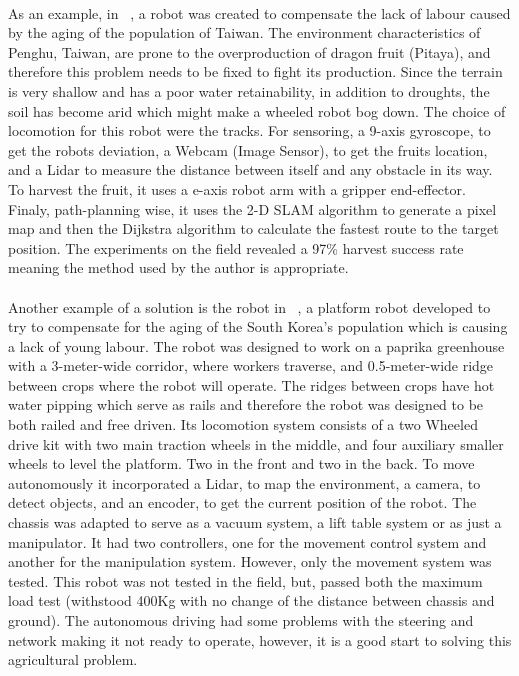 \paragraph{}As an example, in ~\cite{10113871}, a robot was created to compensate the lack of labour caused by the aging of the population of Taiwan. 
The environment characteristics of Penghu, Taiwan, are prone to the overproduction of dragon fruit (Pitaya), and therefore this problem needs 
to be fixed to fight its production. Since the terrain is very shallow and has a poor water retainability, in addition to droughts, the soil 
has become arid which might make a wheeled robot bog down. The choice of locomotion for this robot were the tracks. For sensoring, a 9-axis 
gyroscope, to get the robots deviation, a Webcam (Image Sensor), to get the fruits location, and a Lidar to measure the distance between itself 
and any obstacle in its way. To harvest the fruit, it uses a e-axis robot arm with a gripper end-effector. Finaly, path-planning wise, it uses 
the 2-D SLAM algorithm to generate a pixel map and then the Dijkstra algorithm to calculate the fastest route to the target position. 
The experiments on the field revealed a 97\% harvest success rate meaning the method used by the author is appropriate.

\paragraph{}Another example of a solution is the robot in ~\cite{app12094335}, a platform robot developed to try to compensate for the aging of the South Korea’s 
population which is causing a lack of young labour. The robot was designed to work on a paprika greenhouse with a 3-meter-wide corridor, 
where workers traverse, and 0.5-meter-wide ridge between crops where the robot will operate. The ridges between crops have 
hot water pipping which serve as rails and therefore the robot was designed to be both railed and free driven. Its locomotion system consists 
of a two Wheeled drive kit with two main traction wheels in the middle, and four auxiliary smaller wheels to level the platform. Two in the front and 
two in the back. To move autonomously it incorporated a Lidar, to map the environment, a camera, to detect objects, and an encoder, to get the 
current position of the robot. The chassis was adapted to serve as a vacuum system, a lift table system or as just a manipulator. It had two controllers, 
one for the movement control system and another for the manipulation system. However, only the movement system was tested. This robot was not 
tested in the field, but, passed both the maximum load test (withstood 400Kg with no change of the distance between chassis and ground). 
The autonomous driving had some problems with the steering and network making it not ready to operate, however, it is a good start to solving this agricultural problem.

